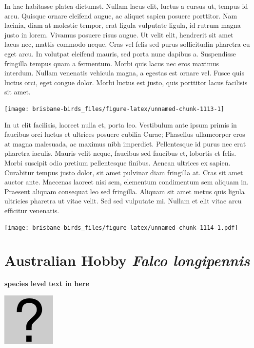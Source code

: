 \documentclass[]{book}
\let\origfigure\figure
\let\endorigfigure\endfigure
\renewenvironment{figure}[1][2] {
  \expandafter\origfigure\expandafter[H]
} {
  \endorigfigure
}
\begin{document}
In hac habitasse platea dictumst. Nullam lacus elit, luctus a cursus ut,
tempus id arcu. Quisque ornare eleifend augue, ac aliquet sapien posuere
porttitor. Nam lacinia, diam at molestie tempor, erat ligula vulputate
ligula, id rutrum magna justo in lorem. Vivamus posuere risus augue. Ut
velit elit, hendrerit sit amet lacus nec, mattis commodo neque. Cras vel
felis sed purus sollicitudin pharetra eu eget arcu. In volutpat eleifend
mauris, sed porta nunc dapibus a. Suspendisse fringilla tempus quam a
fermentum. Morbi quis lacus nec eros maximus interdum. Nullam venenatis
vehicula magna, a egestas est ornare vel. Fusce quis luctus orci, eget
congue dolor. Morbi luctus est justo, quis porttitor lacus facilisis sit
amet.

\begin{figure}
\texttt{[image: brisbane-birds\_files/figure-latex/unnamed-chunk-1113-1]} \caption{insert figure caption}\label{fig:unnamed-chunk-1113}
\end{figure}

In ut elit facilisis, laoreet nulla et, porta leo. Vestibulum ante ipsum
primis in faucibus orci luctus et ultrices posuere cubilia Curae;
Phasellus ullamcorper eros at magna malesuada, ac maximus nibh
imperdiet. Pellentesque id purus nec erat pharetra iaculis. Mauris velit
neque, faucibus sed faucibus et, lobortis et felis. Morbi suscipit odio
pretium pellentesque finibus. Aenean ultrices ex sapien. Curabitur
tempus justo dolor, sit amet pulvinar diam fringilla at. Cras sit amet
auctor ante. Maecenas laoreet nisi sem, elementum condimentum sem
aliquam in. Praesent aliquam consequat leo sed fringilla. Aliquam sit
amet metus quis ligula ultricies pharetra ut vitae velit. Sed sed
vulputate mi. Nullam et elit vitae arcu efficitur venenatis.

\begin{figure}
\centering
\texttt{[image: brisbane-birds\_files/figure-latex/unnamed-chunk-1114-1.pdf]}
\caption{\label{fig:unnamed-chunk-1114}insert figure caption}
\end{figure}

\section{\texorpdfstring{Australian Hobby \emph{Falco
longipennis}}{Australian Hobby Falco longipennis}}\label{australian-hobby-falco-longipennis}

\textbf{species level text in here}

\begin{figure}
\centering
\includegraphics{assets/missing.png}
\caption{No image for species}
\end{figure}
\end{document}
